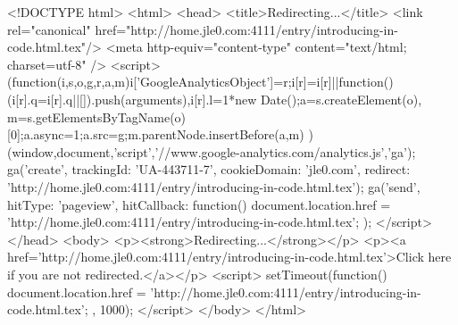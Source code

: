 <!DOCTYPE html>
<html>
<head>
<title>Redirecting...</title>
<link rel="canonical" href="http://home.jle0.com:4111/entry/introducing-in-code.html.tex"/>
<meta http-equiv="content-type" content="text/html; charset=utf-8" />
<script>
(function(i,s,o,g,r,a,m){i['GoogleAnalyticsObject']=r;i[r]=i[r]||function(){
(i[r].q=i[r].q||[]).push(arguments)},i[r].l=1*new Date();a=s.createElement(o),
m=s.getElementsByTagName(o)[0];a.async=1;a.src=g;m.parentNode.insertBefore(a,m)
})(window,document,'script','//www.google-analytics.com/analytics.js','ga');
ga('create', { trackingId: 'UA-443711-7', cookieDomain: 'jle0.com', redirect: 'http://home.jle0.com:4111/entry/introducing-in-code.html.tex'});
ga('send', { hitType: 'pageview', hitCallback: function() { document.location.href = 'http://home.jle0.com:4111/entry/introducing-in-code.html.tex'; } });
</script>
</head>
<body>
  <p><strong>Redirecting...</strong></p>
  <p><a href='http://home.jle0.com:4111/entry/introducing-in-code.html.tex'>Click here if you are not redirected.</a></p>
  <script>
    setTimeout(function() { document.location.href = 'http://home.jle0.com:4111/entry/introducing-in-code.html.tex'; }, 1000);
  </script>
</body>
</html>
